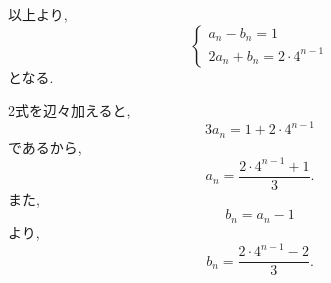 \begin{enumerate}[label=(\arabic*),parsep=3pt]
        以上より,
        \[
          \begin{cases}
            a_n-b_n=1 \\
            2a_n+b_n=2\cdot4^{n-1}
          \end{cases}
        \]
        となる.

        2式を辺々加えると,
        \[
          3a_n=1+2\cdot4^{n-1}
        \]
        であるから,
        \[
          a_n=\frac{2\cdot4^{n-1}+1}{3}.
        \]
        また,
        \[
          b_n=a_n-1
        \]
        より,
        \[
          b_n=\frac{2\cdot4^{n-1}-2}{3}.
        \]
\end{enumerate}
